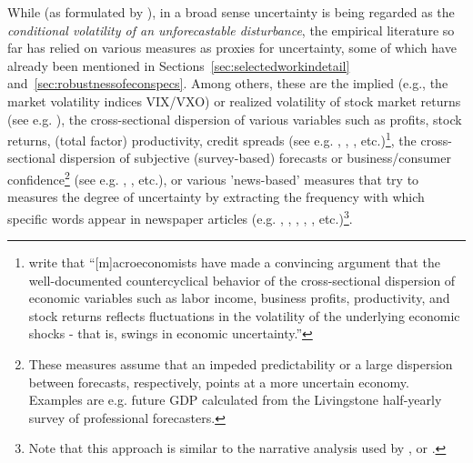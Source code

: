 \documentclass[a4paper,11pt,listof=nochaptergap,oneside,pointednumbers,bibtotoc,bigheadings,liststotoc,hidelinks]{scrbook}
\theoremstyle{mysatz}
\theoremstyle{mydefinition}
\theoremstyle{mytheorem}
\theoremstyle{mybemerkung}
\begin{document}
While (as formulated by \citealp{joetsetal:17}), in a broad sense uncertainty is being regarded as the \textit{conditional volatility of an unforecastable disturbance}, the empirical literature so far has relied on various measures as proxies for uncertainty, some of which have already been mentioned in Sections~\ref{sec:selectedworkindetail} and~\ref{sec:robustnessofeconspecs}. Among others, these are the implied (e.g., the market volatility indices VIX/VXO) or realized volatility of stock market returns (see e.g. \citealp{bloom:09}), the cross-sectional dispersion of various variables such as profits, stock returns, (total factor) productivity, credit spreads (see e.g. \citet{bloom:09}, \citet{gilchristetal:14}, \citet{bloometal:12}, etc.)\footnote{\citet[p. 1]{gilchristetal:14} write that ``[m]acroeconomists have made a convincing argument that the well-documented countercyclical behavior of the cross-sectional dispersion of economic variables such as labor income, business profits, productivity, and stock returns reflects fluctuations in the volatility of the underlying economic shocks - that is, swings in economic uncertainty.''}, the cross-sectional dispersion of subjective (survey-based) forecasts or business/consumer confidence\footnote{These measures assume that an impeded predictability or a large dispersion between forecasts, respectively, points at a more uncertain economy. Examples are e.g. future GDP calculated from the Livingstone half-yearly survey of professional forecasters.} (see e.g. \citet{bachmannetal:13}, \citet{leducandliu:16}, etc.), or various 'news-based' measures that try to measures the degree of uncertainty by extracting the frequency with which specific words appear in newspaper articles (e.g. \citet{alexopoulosandcohen:09}, \citet{bakeretal:15}, \citet{moore:17}, \citet{bontempietal:16}, \citet{castelnuovoandtran:17}, etc.)\footnote{Note that this approach is similar to the narrative analysis used by \citet{romerandromer:04}, \citet{romandrom:17} or \citet{ramey:09}.}.
\end{document}
